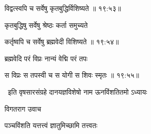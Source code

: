 
{\devanagarifont विद्वत्स्वपि च सर्वेषु कृतबुद्धिर्विशिष्यते {॥ १९:५३॥} \veg\dontdisplaylinenum }%

{\devanagarifont कृतबुद्धिषु सर्वेषु श्रेष्ठः कर्ता समुच्यते \thinspace{\dandab} \dontdisplaylinenum }%


{\devanagarifont कर्तृष्वपि च सर्वेषु ब्रह्मवेदी विशिष्यते {॥ १९:५४॥} \veg\dontdisplaylinenum }%
 
{\devanagarifont ब्रह्मवेदि परं विप्रः नान्यं वेद्मि परं तपः \thinspace{\dandab} \dontdisplaylinenum }%
  

{\devanagarifont स विप्रः स तपस्वी च स योगी स शिवः स्मृतः {॥ १९:५५॥} \veg\dontdisplaylinenum }%

{\devanagarifont 
\jump
\begin{center}
\ketdanda~इति वृषसारसंग्रहे दानयज्ञविशेषो नाम ऊनविंशतितमो ऽध्यायः~\ketdanda
\end{center}
\dontdisplaylinenum\vers  }%
\bekveg\szamveg
\vfill
\phpspagebreak

\thispagestyle{empty}

\centerline{\Large\devanagarifontbold [   विंशतिमो ऽध्यायः  ]}{\vrule depth10pt width0pt} 
\fancyhead[LE]{}
\fancyhead[RE]{}
\fancyhead[LO]{}
\fancyhead[RO]{}
\szam\bek


\vers


{\devanagarifont विगतराग उवाच {\dandab}\dontdisplaylinenum  }%
 
{\devanagarifont पञ्चविंशति यत्तत्त्वं ज्ञातुमिच्छामि तत्त्वतः \thinspace{\danda} \dontdisplaylinenum }%
 
